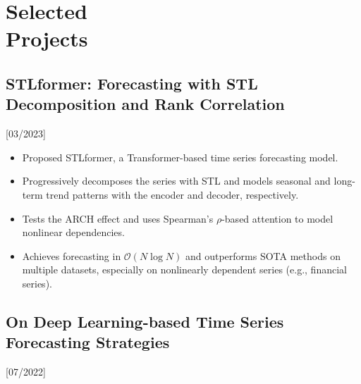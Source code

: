 \documentclass{mycv}
\begin{document}
\section{Selected \\ Projects}



\subsection{STLformer: Forecasting with STL Decomposition and Rank Correlation}[03/2023]

\vspace{-\parskip}

\begin{itemize}
  \item Proposed STLformer, a Transformer-based time series forecasting model.
  \item Progressively decomposes the series with STL and models seasonal and long-term trend patterns with the encoder and decoder, respectively.
  \item Tests the ARCH effect and uses Spearman's $\rho$-based attention to model nonlinear dependencies.
  \item Achieves forecasting in $\mathcal{O}(N \log{N})$ and outperforms SOTA methods on multiple datasets, especially on nonlinearly dependent series (e.g., financial series).
\end{itemize}

\vspace{-\parskip}

\subsection{On Deep Learning-based Time Series Forecasting Strategies}[07/2022]

\vspace{-\parskip}
\end{document}
